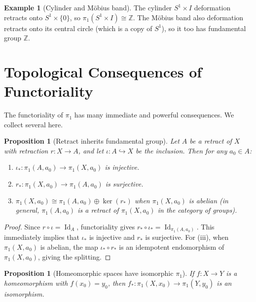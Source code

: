\documentclass[12pt,a4paper,openany]{book}
\theoremstyle{definition}
\newtheorem{example}[definition]{Example}
\theoremstyle{plain}
\newtheorem{proposition}[definition]{Proposition}
\theoremstyle{remark}
\newcommand{\Z}{\mathbb{Z}}
\DeclareMathOperator{\Id}{Id}
\begin{document}
\begin{example}[Cylinder and M\"{o}bius band]\label{ex:cylinder-mobius}
The cylinder $S^1 \times I$ deformation retracts onto $S^1 \times \{0\}$, so
$\pi_1(S^1 \times I) \cong \Z$. The M\"{o}bius band also deformation retracts
onto its central circle (which is a copy of $S^1$), so it too has fundamental
group $\Z$.
\end{example}


\section{Topological Consequences of Functoriality}\label{sec:consequences-functoriality}

The functoriality of $\pi_1$ has many immediate and powerful consequences. We
collect several here.

\begin{proposition}[Retract inherits fundamental group]\label{prop:retract-pi1}
Let $A$ be a retract of $X$ with retraction $r \colon X \to A$, and let $\iota
\colon A \hookrightarrow X$ be the inclusion. Then for any $a_0 \in A$:
\begin{enumerate}[label=(\roman*)]
\item $\iota_* \colon \pi_1(A, a_0) \to \pi_1(X, a_0)$ is injective.
\item $r_* \colon \pi_1(X, a_0) \to \pi_1(A, a_0)$ is surjective.
\item $\pi_1(X, a_0) \cong \pi_1(A, a_0) \oplus \ker(r_*)$ when $\pi_1(X, a_0)$
  is abelian (in general, $\pi_1(A, a_0)$ is a retract of $\pi_1(X, a_0)$ in the
  category of groups).
\end{enumerate}
\end{proposition}

\begin{proof}
Since $r \circ \iota = \Id_A$, functoriality gives $r_* \circ \iota_* =
\Id_{\pi_1(A, a_0)}$. This immediately implies that $\iota_*$ is injective and
$r_*$ is surjective. For (iii), when $\pi_1(X, a_0)$ is abelian, the map
$\iota_* \circ r_*$ is an idempotent endomorphism of $\pi_1(X, a_0)$, giving
the splitting.
\end{proof}

\begin{proposition}[Homeomorphic spaces have isomorphic $\pi_1$]\label{prop:homeo-pi1}
If $f \colon X \to Y$ is a homeomorphism with $f(x_0) = y_0$, then $f_* \colon
\pi_1(X, x_0) \to \pi_1(Y, y_0)$ is an isomorphism.
\end{proposition}
\end{document}
